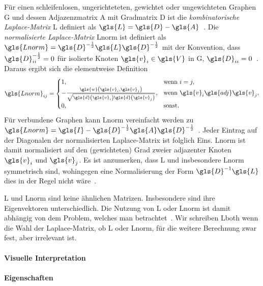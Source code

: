 Für einen schleifenlosen, ungerichteteten, gewichtet oder ungewichteten Graphen \gls{G} und dessen Adjazenzmatrix \gls{A} mit Gradmatrix \gls{D} ist die \emph{kombinatorische Laplace-Matrix} \gls{L} definiert als $\gls{L} = \gls{D} - \gls{A}$~\cite{Chung}.
Die \emph{normalisierte Laplace-Matrix} \gls{Lnorm} ist definiert als $\gls{Lnorm} = \gls{D}^{-\frac{1}{2}} \gls{L} \gls{D}^{-\frac{1}{2}}$ mit der Konvention, dass $\gls{D}^{-\frac{1}{2}}_{ii} = 0$ für isolierte Knoten $\gls{v}_i \in \gls{V}$ in \gls{G}, \dhe{} $\gls{D}_{ii} = 0$~\cite{Chung}.
Daraus ergibt sich die elementweise Definition
\begin{equation*}
  \gls{Lnorm}_{ij} = \begin{cases}
  1, & \text{wenn }i = j,\\
    -\frac{\gls{w}\left(\gls{v}_i, \gls{v}_j\right)}{\sqrt{\gls{d}\left(\gls{v}_i\right)\gls{d}\left(\gls{v}_j\right)}}, & \text{wenn }\gls{v}_i \gls{adj} \gls{v}_j,\\
  0, & \text{sonst.}
\end{cases}
\end{equation*}
Für verbundene Graphen kann \gls{Lnorm} vereinfacht werden zu $\gls{Lnorm} = \gls{I} - \gls{D}^{-\frac{1}{2}} \gls{A} \gls{D}^{-\frac{1}{2}}$~\cite{Chung}.
Jeder Eintrag auf der Diagonalen der normalisierten Laplace-Matrix ist folglich Eins.
\gls{Lnorm} ist damit normalisiert auf den (gewichteten) Grad zweier adjazenter Knoten $\gls{v}_i$ und $\gls{v}_j$.
Es ist anzumerken, dass \gls{L} und insbesondere \gls{Lnorm} symmetrisch sind, wohingegen eine Normalisierung der Form $\gls{D}^{-1}\gls{L}$ dies in der Regel nicht wäre~\cite{Reuter}.

\gls{L} und \gls{Lnorm} sind keine ähnlichen Matrizen.
Insbesondere sind ihre Eigenvektoren unterschiedlich.
Die Nutzung von \gls{L} oder \gls{Lnorm} ist damit abhängig von dem Problem, welches man betrachtet~\cite{Hammond}.
Wir schreiben \gls{Lboth} wenn die Wahl der Laplace-Matrix, ob \gls{L} oder \gls{Lnorm}, für die weitere Berechnung zwar fest, aber irrelevant ist.

\paragraph{Visuelle Interpretation}
\label{laplace_interpretation}


\paragraph{Eigenschaften}
\label{laplace_eigenschaften}


